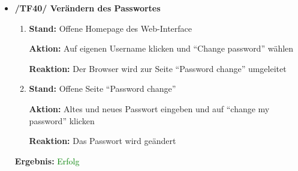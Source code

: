 \documentclass[a4paper]{scrreprt}
\begin{document}
\begin{itemize}
		      				\item \textbf{/TF40/ Ver\"andern des Passwortes}
		                              \begin{enumerate}
		                                  \item \par \textbf{Stand: }Offene Homepage des Web-Interface
		                                      \par \textbf{Aktion: }Auf eigenen Username klicken und ``Change password'' w\"ahlen
		                                      \par \textbf{Reaktion: }Der Browser wird zur Seite ``Password change'' umgeleitet
		      							\item \par \textbf{Stand: }Offene Seite ``Password change''
		                                      \par \textbf{Aktion: }Altes und neues Passwort eingeben und auf ``change my password'' klicken
		                                      \par \textbf{Reaktion: }Das Passwort wird ge\"andert                                
		                              \end{enumerate}		         
		      		           \vspace*{0.3cm}
		      		           \par \textbf{Ergebnis: }\textcolor{green}{Erfolg}
		      		           \vspace*{0.6cm}		        
		      		           

\end{itemize}
\end{document}
